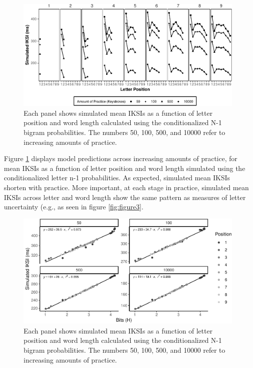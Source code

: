 \documentclass[,man,floatsintext]{apa6}
\begin{document}
\begin{figure}
\centering
\includegraphics{v2-manuscript_files/figure-latex/figure5-1.pdf}
\caption{\label{fig:figure5}Each panel shows simulated mean IKSIs as a function of letter position and word length calculated using the conditionalized N-1 bigram probabilities. The numbers 50, 100, 500, and 10000 refer to increasing amounts of practice.}
\end{figure}



Figure \ref{fig:figure5} displays model predictions across increasing amounts of practice, for mean IKSIs as a function of letter position and word length simulated using the conditionalized letter n-1 probabilities. As expected, simulated mean IKSIs shorten with practice. More important, at each stage in practice, simulated mean IKSIs across letter and word length show the same pattern as measures of letter uncertainty (e.g., as seen in figure \ref{fig:figure3}.

\begin{figure}
\centering
\includegraphics{v2-manuscript_files/figure-latex/figureInstanceBits-1.pdf}
\caption{\label{fig:figureInstanceBits}Each panel shows simulated mean IKSIs as a function of letter position and word length calculated using the conditionalized N-1 bigram probabilities. The numbers 50, 100, 500, and 10000 refer to increasing amounts of practice.}
\end{figure}
\end{document}
